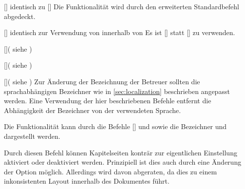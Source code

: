 \begin{DeclareEntity}{}
\begin{Declaration}{[]}{%
  identisch zu []%
}
\printdeclarationlist%
%
Die Funktionalität wird durch den erweiterten Standardbefehl  
abgedeckt.
\end{Declaration}

\begin{Declaration}{[]}{%
  identisch zur Verwendung von  innerhalb von %
}
\printdeclarationlist%
%
Es ist []
statt [] zu verwenden.
\end{Declaration}

\begin{Declaration}{[]}(%
  siehe %
)
\begin{Declaration}{[]}(%
  siehe %
)
\begin{Declaration}{[]}(%
  siehe %
)
\printdeclarationlist%
%
Zur Änderung der Bezeichnung der Betreuer sollten die sprachabhängigen 
Bezeichner wie in \autoref{sec:localization} beschrieben angepasst werden. Eine 
Verwendung der hier beschriebenen Befehle entfernt die Abhängigkeit der 
Bezeichner von der verwendeten Sprache.
\end{Declaration}
\end{Declaration}
\end{Declaration}

\begin{Declaration}{}
\printdeclarationlist%
%
Die Funktionalität kann durch die Befehle [] und 
 sowie die Bezeichner  und 
 dargestellt werden.
\end{Declaration}

\begin{Declaration}{}
\printdeclarationlist%
%
Durch diesen Befehl können Kapitelseiten konträr zur eigentlichen Einstellung 
aktiviert oder deaktiviert werden. Prinzipiell ist dies auch durch eine 
Änderung der Option  möglich. Allerdings wird davon 
abgeraten, da dies zu einem inkonsistenten Layout innerhalb des Dokumentes 
führt.
\end{Declaration}


\end{DeclareEntity}
